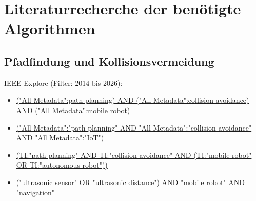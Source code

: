 \documentclass[
  a4paper,
  12pt,
  DIV=12,        %
  parskip=half,  %
  headings=small %
]{scrartcl}
\theoremstyle{definition}
\theoremstyle{definition}
\begin{document}

\section*{Literaturrecherche der benötigte Algorithmen}
\subsection*{Pfadfindung und Kollisionsvermeidung}

IEEE Explore (Filter: 2014 bis 2026):
\begin{itemize}

\item \href{https://ieeexplore.ieee.org/search/searchresult.jsp?action=search&newsearch=true&matchBoolean=true&queryText=(\%22All\%20Metadata\%22:path\%20planning)\%20AND\%20(\%22All\%20Metadata\%22:collision\%20avoidance)\%20AND\%20(\%22All\%20Metadata\%22:mobile\%20robot)\&ranges=2014_2027_Year}
{("All Metadata":path planning) AND ("All Metadata":collision avoidance) AND ("All Metadata":mobile robot)}

\item \href{https://ieeexplore.ieee.org/search/searchresult.jsp?action=search&newsearch=true&matchBoolean=true&queryText=(\%22All\%20Metadata\%22:\%22path\%20planning\%22\%20AND\%20\%22All\%20Metadata\%22:\%22collision\%20avoidance\%22\%20AND\%20\%22All\%20Metadata\%22:\%22IoT\%22)\&ranges=2014_2027_Year}
{("All Metadata":"path planning" AND "All Metadata":"collision avoidance" AND "All Metadata":"IoT")}

\item \href{https://ieeexplore.ieee.org/search/searchresult.jsp?action=search&matchBoolean=true&newsearch=true&queryText=(TI:\%22path\%20planning\%22\%20AND\%20TI:\%22collision\%20avoidance\%22\%20AND\%20(TI:\%22mobile\%20robot\%22\%20OR\%20TI:\%22autonomous\%20robot\%22))}
{(TI:"path planning" AND TI:"collision avoidance" AND (TI:"mobile robot" OR TI:"autonomous robot"))}

\item \href{https://ieeexplore.ieee.org/search/searchresult.jsp?action=search&matchBoolean=true&queryText=((\%22ultrasonic\%20sensor\%22\%20OR\%20\%22ultrasonic\%20distance\%22)\%20AND\%20\%22mobile\%20robot\%22\%20AND\%20\%22navigation\%22)\&highlight=true\&returnFacets=ALL\&returnType=SEARCH\&matchPubs=true\&rowsPerPage=25\&ranges=2014_2026_Year}
{("ultrasonic sensor" OR "ultrasonic distance") AND "mobile robot" AND "navigation"}


\end{itemize}
\end{document}

